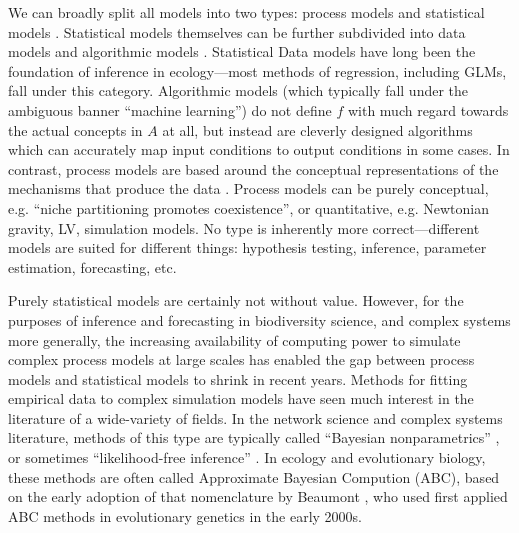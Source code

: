 \documentclass[]{article}
\begin{document}
We can broadly split all models into two types: process models and statistical models
\citep{mcelreath_statistical_2020}. Statistical models themselves can be further subdivided
into data models and algorithmic models \citep{breiman_statistical_2001}.
Statistical Data models have long been the foundation of inference in
ecology---most methods of regression, including GLMs, fall under this category.
Algorithmic models (which typically fall under the ambiguous banner
``machine learning'') do not define \(f\) with much regard towards the
actual concepts in \(A\) at all, but instead are cleverly designed
algorithms which can accurately map input conditions to output
conditions in some cases. In contrast, process models are based around
the conceptual representations of the mechanisms that produce the data \citep{mcelreath_statistical_2020}. Process models can be purely conceptual, e.g. ``niche partitioning promotes coexistence'', or quantitative, e.g. Newtonian gravity, LV, simulation models.
No type is inherently more correct---different models are suited for different things: hypothesis testing, inference, parameter estimation, forecasting, etc.

Purely statistical models are certainly not without value. However, for
the purposes of inference and forecasting in biodiversity science, and
complex systems more generally, the increasing availability of computing
power to simulate complex process models at large scales has enabled
the gap between process models and statistical models to shrink in
recent years. Methods for fitting empirical data to complex simulation
models have seen much interest in the literature of a wide-variety of
fields. In the network science and complex systems
literature, methods of this type are typically called ``Bayesian
nonparametrics'' \citep{orbanz_bayesian_2015}, or sometimes ``likelihood-free
inference'' \citep{alsing_massive_2018, didelot_likelihood-free_2011, drovandi_likelihood-free_2011}. In ecology and evolutionary biology, these methods are
often called Approximate Bayesian Compution (ABC), based on the early
adoption of that nomenclature by Beaumont \citep{beaumont_approximate_2019}, who
used first applied ABC methods in evolutionary genetics in the early 2000s.
\end{document}
